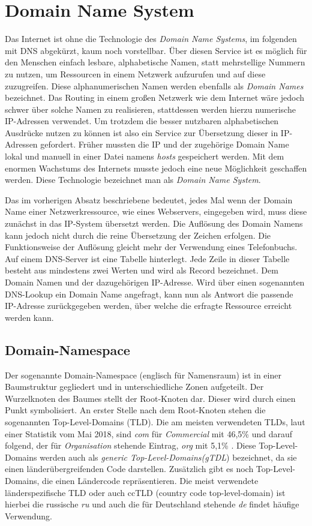 
\section{Domain Name System}

Das Internet ist ohne die Technologie des \emph{Domain Name Systems}, im folgenden mit DNS abgekürzt, kaum noch vorstellbar. Über diesen Service ist es möglich für den Menschen einfach lesbare, alphabetische Namen, statt mehrstellige Nummern zu nutzen, um Ressourcen in einem Netzwerk aufzurufen und auf diese zuzugreifen. Diese alphanumerischen Namen werden ebenfalls als \emph{Domain Names} bezeichnet. Das Routing in einem großen Netzwerk wie dem Internet wäre jedoch schwer über solche Namen zu realisieren, stattdessen werden hierzu numerische IP-Adressen verwendet. Um trotzdem die besser nutzbaren alphabetischen Ausdrücke nutzen zu können ist also ein Service zur Übersetzung dieser in IP-Adressen gefordert. Früher mussten die IP und der zugehörige Domain Name lokal und manuell in einer Datei namens \textit{hosts} gespeichert werden. Mit dem enormen Wachstums des Internets musste jedoch eine neue Möglichkeit geschaffen werden. Diese Technologie bezeichnet man als \emph{Domain Name System}. \cite{Schreiner.2016}

Das im vorherigen Absatz beschriebene bedeutet, jedes Mal wenn der Domain Name einer Netzwerkressource, wie eines Webservers, eingegeben wird, muss diese zunächst in das IP-System übersetzt werden. Die Auflösung des Domain Namens kann jedoch nicht durch die reine Übersetzung der Zeichen erfolgen. Die Funktionsweise der Auflösung gleicht mehr der Verwendung eines Telefonbuchs. Auf einem DNS-Server ist eine Tabelle hinterlegt. Jede Zeile in dieser Tabelle besteht aus mindestens zwei Werten und wird als Record bezeichnet. Dem Domain Namen und der dazugehörigen IP-Adresse. Wird über einen sogenannten DNS-Lookup ein Domain Name angefragt, kann nun als Antwort die passende IP-Adresse zurückgegeben werden, über welche die erfragte Ressource erreicht werden kann.

\subsection{Domain-Namespace}
Der sogenannte Domain-Namespace (englisch für Namensraum) ist in einer Baumstruktur gegliedert und in unterschiedliche Zonen aufgeteilt. Der Wurzelknoten des Baumes stellt der Root-Knoten dar. Dieser wird durch einen Punkt symbolisiert. An erster Stelle nach dem Root-Knoten stehen die sogenannten Top-Level-Domains (TLD). Die am meisten verwendeten TLDs, laut einer Statistik vom Mai 2018, sind \textit{com} für \textit{Commercial} mit 46,5\% und darauf folgend, der für \textit{Organisation} stehende Eintrag, \textit{org} mit 5,1\% \cite{w3techs.2018}. Diese Top-Level-Domains werden auch als \textit{generic Top-Level-Domains(gTDL}) bezeichnet, da sie einen länderübergreifenden Code darstellen. Zusätzlich gibt es noch Top-Level-Domains, die einen Ländercode repräsentieren. Die meist verwendete länderspezifische TLD oder auch ccTLD (country code top-level-domain) ist hierbei die russische \textit{ru} und auch die für Deutschland stehende \textit{de} findet häufige Verwendung. \cite{IndianaUniversity.14.05.2018} 

